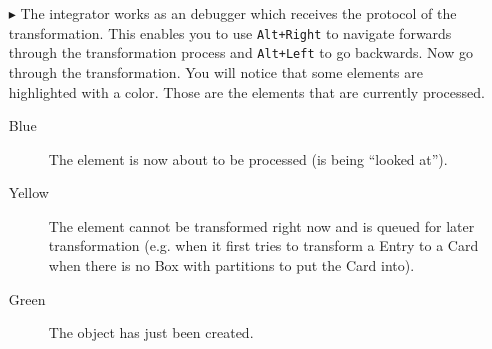 \begin{enumerate}
\item[$\blacktriangleright$] The integrator works as an debugger which receives the protocol of the transformation. This enables you to use \texttt{Alt+Right} to navigate forwards through the transformation process and \texttt{Alt+Left} to go backwards. Now go through the transformation.
You will notice that some elements are highlighted with a color. Those are the elements that are currently processed.

\begin{description}
  \item[Blue] The element is now about to be processed (is being ``looked at'').
  \item[Yellow] The element cannot be transformed right now and is queued for later transformation (e.g. when it first tries to transform a Entry to a Card when there is no Box with partitions to put the Card into).
  \item[Green] The object has just been created.
\end{description}



\end{enumerate}


